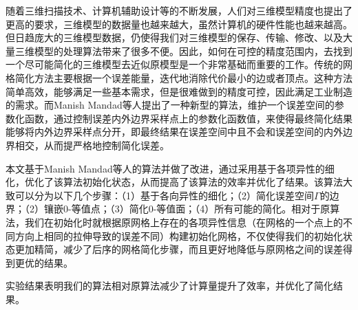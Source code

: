 
\begin{cabstract}
随着三维扫描技术、计算机辅助设计等的不断发展，人们对三维模型精度也提出了更高的要求，三维模型的数据量也越来越大，虽然计算机的硬件性能也越来越高。但日趋庞大的三维模型数据，仍使得我们对三维模型的保存、传输、修改、以及大量三维模型的处理算法带来了很多不便。因此，如何在可控的精度范围内，去找到一个尽可能简化的三维模型去近似原模型是一个非常基础而重要的工作。传统的网格简化方法主要根据一个误差能量，迭代地消除代价最小的边或者顶点。这种方法简单高效，能够满足一些基本需求，但是很难做到的精度可控，因此满足工业制造的需求。而Manish Mandad等人提出了一种新型的算法\cite{isotopic-appro}，维护一个误差空间的参数化函数，通过控制误差内外边界采样点上的参数化函数值，来使得最终简化结果能够将内外边界采样点分开，即最终结果在误差空间中且不会和误差空间的内外边界相交，从而提严格地控制简化误差。\par
本文基于Manish Mandad等人的算法\cite{isotopic-appro}并做了改进，通过采用基于各项异性的细化，优化了该算法初始化状态，从而提高了该算法的效率并优化了结果。该算法大致可以分为以下几个步骤：（1）基于各向异性的细化；（2）简化误差空间$\Gamma$的边界；（2）镶嵌0-等值点；（3）简化0-等值面；（4）所有可能的简化。相对于原算法，我们在初始化时就根据原网格上存在的各项异性信息（在网格的一个点上的不同方向上相同的拉伸导致的误差不同）构建初始化网格，不仅使得我们的初始化状态更加精简，减少了后序的网格简化步骤，而且更好地降低与原网格之间的误差得到更优的结果。\par
实验结果表明我们的算法相对原算法减少了计算量提升了效率，并优化了简化结果。
\end{cabstract}

